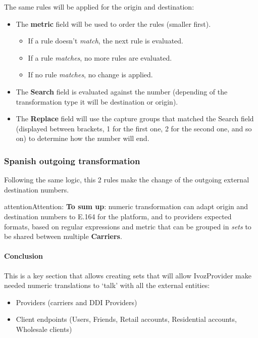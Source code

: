 \documentclass[letterpaper,10pt,english]{sphinxmanual}
\begin{document}
The same rules will be applied for the origin and destination:
\begin{itemize}
\item {} 
The \textbf{metric} field will be used to order the rules (smaller first).
\begin{itemize}
\item {} 
If a rule doesn't \emph{match}, the next rule is evaluated.

\item {} 
If a rule \emph{matches}, no more rules are evaluated.

\item {} 
If no rule \emph{matches}, no change is applied.

\end{itemize}

\item {} 
The \textbf{Search} field is evaluated against the number (depending of the
transformation type it will be destination or origin).

\item {} 
The \textbf{Replace} field will use the capture groups that matched the Search
field (displayed between brackets, 1 for the first one, 2 for the second
one, and so on) to determine how the number will end.

\end{itemize}


\subsubsection{Spanish outgoing transformation}
\label{administration_portal/brand/settings/numeric_transformations:spanish-outgoing-transformation}
Following the same logic, this 2 rules make the change of the outgoing external
destination numbers.

\begin{notice}{attention}{Attention:}
\textbf{To sum up}: numeric transformation can adapt origin and
destination numbers to E.164 for the platform, and to providers expected
formats, based on regular expressions and metric that can be grouped in \emph{sets}
to be shared between multiple \textbf{Carriers}.
\end{notice}


\paragraph{Conclusion}
\label{administration_portal/brand/settings/numeric_transformations:conclusion}
This is a key section that allows creating sets that will allow IvozProvider make needed numeric translations to `talk'
with all the external entities:
\begin{itemize}
\item {} 
Providers (carriers and DDI Providers)

\item {} 
Client endpoints (Users, Friends, Retail accounts, Residential accounts, Wholesale clients)

\end{itemize}
\end{document}
